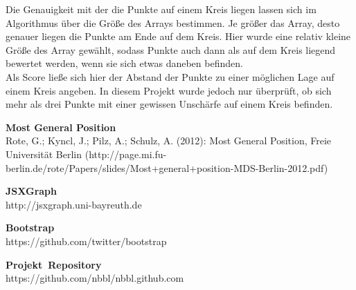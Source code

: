 \documentclass[a4paper,twocolumn]{scrartcl}
\begin{document}
Die Genauigkeit mit der die Punkte auf einem Kreis liegen lassen sich im Algorithmus über die Größe des Arrays bestimmen. Je größer das Array, desto genauer liegen die Punkte am Ende auf dem Kreis. Hier wurde eine relativ kleine Größe des Array gewählt, sodass Punkte auch dann als auf dem Kreis liegend bewertet werden, wenn sie sich etwas daneben befinden.\\
Als Score ließe sich hier der Abstand der Punkte zu einer möglichen Lage auf einem Kreis angeben. In diesem Projekt wurde jedoch nur überprüft, ob sich mehr als drei Punkte mit einer gewissen Unschärfe auf einem Kreis befinden.


\begin{thebibliography}{9}
\textbf{Most General Position} \\
Rote, G.; Kyncl, J.; Pilz, A.; Schulz, A. (2012): Most General Position, Freie Universität Berlin
(http://page.mi.fu-berlin.de/rote/Papers/slides/Most+general+position-MDS-Berlin-2012.pdf)

\textbf{JSXGraph} \\
http://jsxgraph.uni-bayreuth.de

\textbf{Bootstrap} \\
https://github.com/twitter/bootstrap

\textbf{Projekt~Repository} \\
https://github.com/nbbl/nbbl.github.com
\end{thebibliography}
\end{document}
